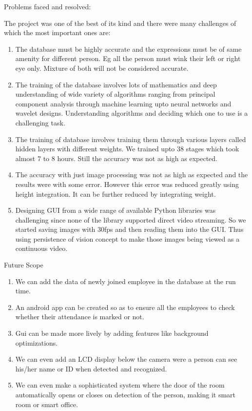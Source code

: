 \documentclass[14pt]{article}
\begin{document}
\begin{center}
{\Huge Problems faced and resolved:}
\end{center}
The project was one of the best of its kind and there were many challenges of which the most important ones are:
\begin{enumerate}
	
\item The database must be highly accurate and the expressions must be of same amenity for different
	person. Eg all the person must wink their left or right eye only. Mixture of both will not be
	considered accurate.
	\item The training of the database involves lots of mathematics and deep understanding of wide
	variety of algorithms ranging from principal component analysis through machine learning upto
	neural networks and wavelet designs. Understanding algorithms and deciding which one to use is
	a challenging task.
	\item The training of database involves training them through various layers called hidden layers with
	different weights. We trained upto 38 stages which took almost 7 to 8 hours. Still the accuracy
	was not as high as expected.
	 \item The accuracy with just image processing was not as high as expected and the results were with
	some error. However this error was reduced greatly using height integration. It can be further
	reduced by integrating weight.
	 \item Designing GUI from a wide range of available Python libraries was challenging since none of
	the library supported direct video streaming. So we started saving images with 30fps and then
	reading them into the GUI. Thus using persistence of vision concept to make those images being
	viewed as a continuous video.

\end{enumerate}
\break

\begin{center}
{\Huge Future Scope}
\end{center}

\begin{enumerate}
	\item  We can add the data of newly joined employee in the database at the run time.
	 \item An android app can be created so as to ensure all the employees to check whether their
	attendance is marked or not.
	\item Gui can be made more lively by adding features like background optimizations.
	 \item We can even add an LCD display below the camera were a person can see his/her name or ID
	when detected and recognized.
	\item  We can even make a sophisticated system where the door of the room automatically opens or
	closes on detection of the person, making it smart room or smart office.
\end{enumerate}
\end{document}

